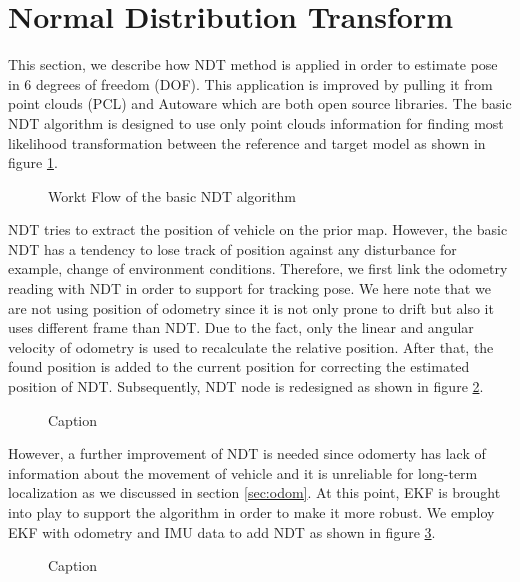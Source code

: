 \section{Normal Distribution Transform}
This section, we describe how NDT method is applied in order to estimate pose in 6 degrees of freedom (DOF). This application is improved by pulling it from point clouds (PCL) and Autoware which are both open source libraries. The basic NDT algorithm is designed to use only point clouds information for finding  most likelihood transformation between the reference and target model as shown in figure \ref{fig:ndt}.
\begin{figure}[H]
    \centering
    \setlength{\fboxsep}{0pt}%
    \setlength{\fboxrule}{1pt}%
    \caption{Workt Flow of the basic NDT algorithm} 
    \label{fig:ndt}
\end{figure}
NDT tries to extract the position of vehicle on the prior map. However, the basic NDT has a tendency to lose track of position against any disturbance for example, change of environment conditions. Therefore, we first link the odometry reading with NDT in order to support for tracking pose. We here note that we are not using position of odometry since it is not only prone to drift but also it uses different frame than NDT. Due to the fact, only the linear and angular velocity of odometry is used to recalculate the relative position. After that, the found position is added to the current position for correcting the estimated position of NDT. Subsequently, NDT node is redesigned as shown in figure \ref{fig:ndt_odom}.
\begin{figure}[H]
    \centering
    \setlength{\fboxsep}{0pt}%
    \setlength{\fboxrule}{1pt}%
    \caption{Caption}
    \label{fig:ndt_odom}
\end{figure}
\par However, a further improvement of NDT is needed since odomerty has lack of information about the movement of vehicle and it is unreliable for long-term localization as we discussed in section \ref{sec:odom}. At this point, EKF is brought into play to support the algorithm in order to make it more robust. We employ EKF with odometry and IMU data to add NDT as shown in figure \ref{fig:ndt_ekf}.
\begin{figure}
    \centering
    \setlength{\fboxsep}{0pt}%
    \setlength{\fboxrule}{1pt}%
    \caption{Caption}
    \label{fig:ndt_ekf}
\end{figure}

